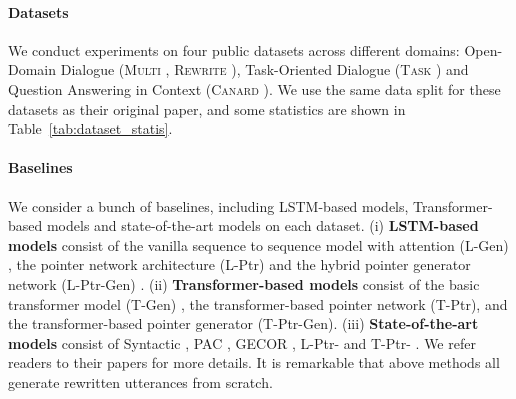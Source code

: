 \documentclass[11pt,a4paper]{article}
\begin{document}
\begin{table}[t]
    \centering
    \caption{Statistics of different datasets. NA means the development set is also the test set. ``Ques'' is short for questions, ``Avg'' for average, ``len'' for length, ``Con'' for context utterance, ``Cur'' for current utterance, and ``Rew'' for rewritten utterance. }
    \label{tab:dataset_statis}
\end{table}

\paragraph{Datasets} We conduct experiments on four public datasets across different domains: Open-Domain Dialogue \big(\textsc{Multi} \citealp{pan-etal-2019-improving}, \textsc{Rewrite} \citealp{su-etal-2019-improving}\big), Task-Oriented Dialogue \big(\textsc{Task} \citealp{quan-etal-2019-gecor}\big) and Question Answering in Context \big(\textsc{Canard} \citealp{elgohary-etal-2019-unpack}\big). We use the same data split for these datasets as their original paper, and some statistics are shown in Table~\ref{tab:dataset_statis}.

\paragraph{Baselines} We consider a bunch of baselines, including LSTM-based models, Transformer-based models and state-of-the-art models on each dataset. (i) \textbf{LSTM-based models} consist of the vanilla sequence to sequence model with attention (L-Gen) \cite{seq2seq_attn_2015}, the pointer network architecture (L-Ptr) \cite{oriol-2015-pointer} and the hybrid pointer generator network (L-Ptr-Gen) \cite{see-etal-2017-get}. (ii) \textbf{Transformer-based models} consist of the basic transformer model (T-Gen) \cite{transformer_2017}, the transformer-based pointer network (T-Ptr), and the transformer-based pointer generator (T-Ptr-Gen). (iii) \textbf{State-of-the-art models} consist of Syntactic \cite{kumar-joshi-2016-non}, PAC \cite{pan-etal-2019-improving}, GECOR \cite{quan-etal-2019-gecor}, L-Ptr- and T-Ptr- \cite{su-etal-2019-improving}. We refer readers to their papers for more details. It is remarkable that above methods all generate rewritten utterances from scratch.
\end{document}

